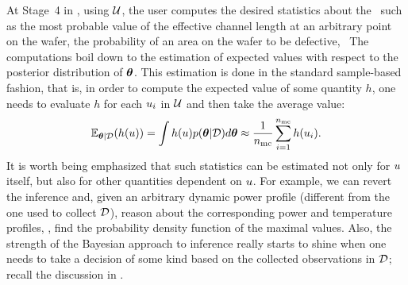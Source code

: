 At Stage~4 in , using $\mathcal{U}$, the user computes the desired statistics about the \qoi\ such as the most probable value of the effective channel length at an arbitrary point on the wafer, the probability of an area on the wafer to be defective, \etc\ The computations boil down to the estimation of expected values with respect to the posterior distribution of ${\boldsymbol\theta}$. This estimation is done in the standard sample-based fashion, that is, in order to compute the expected value of some quantity $h$, one needs to evaluate $h$ for each $u_i$ in $\mathcal{U}$ and then take the average value:
\[
  \E_{\vparam | \Data}(h(\u)) = \int h(\u) \f{\vparam | \Data} d\vparam \approx \frac{1}{\nsamples} \sum_{i = 1}^\nsamples h(\u_i).
\]
It is worth being emphasized that such statistics can be estimated not only for $u$ itself, but also for other quantities dependent on $u$.
For example, we can revert the inference and, given an arbitrary dynamic power profile (different from the one used to collect $\mathcal{D}$), reason about the corresponding power and temperature profiles, \eg, find the probability density function of the maximal values.
Also, the strength of the Bayesian approach to inference really starts to shine when one needs to take a decision of some kind based on the collected observations in $\mathcal{D}$; recall the discussion in .
